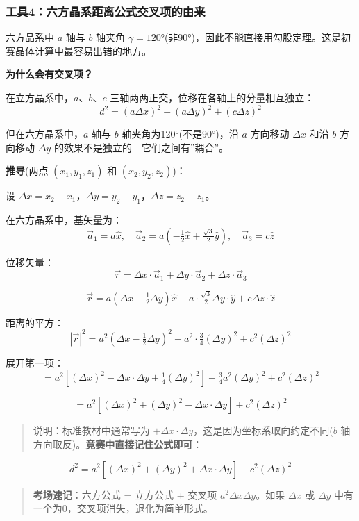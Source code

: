 \documentclass[a4paper,11pt]{ctexart}
\newcommand{\箭}{\ensuremath{\rightarrow}}
\newcommand{\左箭}{\ensuremath{\leftarrow}}
\newcommand{\上箭}{\ensuremath{\uparrow}}
\newcommand{\下箭}{\ensuremath{\downarrow}}
\newcommand{\衡}{\ensuremath{\rightleftharpoons}}
\newcommand{\双箭}{\ensuremath{\leftrightarrow}}
\newcommand{\约等于}{\ensuremath{\approx}}
\newcommand{\小于等于}{\ensuremath{\leq}}
\newcommand{\大于等于}{\ensuremath{\geq}}
\newcommand{\不等于}{\ensuremath{\neq}}
\newcommand{\西格马}{\ensuremath{\sigma}}
\newcommand{\派}{\ensuremath{\pi}}
\begin{document}
\subsubsection{工具4：六方晶系距离公式交叉项的由来}\label{ux5de5ux51774ux516dux65b9ux6676ux7cfbux8dddux79bbux516cux5f0fux4ea4ux53c9ux9879ux7684ux7531ux6765}

六方晶系中 \(a\) 轴与 \(b\) 轴夹角 \(\gamma = 120°\)(非90°)，因此不能直接用勾股定理。这是初赛晶体计算中最容易出错的地方。

\textbf{为什么会有交叉项？}

在立方晶系中，\(a\)、\(b\)、\(c\) 三轴两两正交，位移在各轴上的分量相互独立：
\[d^2 = (a\Delta x)^2 + (a\Delta y)^2 + (c\Delta z)^2\]

但在六方晶系中，\(a\) 轴与 \(b\) 轴夹角为120°(不是90°)，沿 \(a\) 方向移动 \(\Delta x\) 和沿 \(b\) 方向移动 \(\Delta y\) 的效果不是独立的---它们之间有''耦合''。

\textbf{推导}(两点 \((x_1,y_1,z_1)\) 和 \((x_2,y_2,z_2)\))：

设 \(\Delta x = x_2 - x_1\)，\(\Delta y = y_2 - y_1\)，\(\Delta z = z_2 - z_1\)。

在六方晶系中，基矢量为：
\[\vec{a}_1 = a\hat{x}, \quad \vec{a}_2 = a(-\tfrac{1}{2}\hat{x} + \tfrac{\sqrt{3}}{2}\hat{y}), \quad \vec{a}_3 = c\hat{z}\]

位移矢量：
\[\vec{r} = \Delta x \cdot \vec{a}_1 + \Delta y \cdot \vec{a}_2 + \Delta z \cdot \vec{a}_3\]

\[\vec{r} = a(\Delta x - \tfrac{1}{2}\Delta y)\hat{x} + a \cdot \tfrac{\sqrt{3}}{2}\Delta y \cdot \hat{y} + c\Delta z \cdot \hat{z}\]

距离的平方：
\[|\vec{r}|^2 = a^2(\Delta x - \tfrac{1}{2}\Delta y)^2 + a^2 \cdot \tfrac{3}{4}(\Delta y)^2 + c^2(\Delta z)^2\]

展开第一项：
\[= a^2[(\Delta x)^2 - \Delta x \cdot \Delta y + \tfrac{1}{4}(\Delta y)^2] + \tfrac{3}{4}a^2(\Delta y)^2 + c^2(\Delta z)^2\]

\[= a^2[(\Delta x)^2 + (\Delta y)^2 - \Delta x \cdot \Delta y] + c^2(\Delta z)^2\]

\begin{quote}
说明：标准教材中通常写为 \(+\Delta x \cdot \Delta y\)，这是因为坐标系取向约定不同(\(b\) 轴方向取反)。\textbf{竞赛中直接记住公式即可}：
\end{quote}

\[\boxed{d^2 = a^2[(\Delta x)^2 + (\Delta y)^2 + \Delta x \cdot \Delta y] + c^2(\Delta z)^2}\]

\begin{quote}
\textbf{考场速记}：六方公式 = 立方公式 + 交叉项 \(a^2 \Delta x \Delta y\)。如果 \(\Delta x\) 或 \(\Delta y\) 中有一个为0，交叉项消失，退化为简单形式。
\end{quote}
\end{document}
